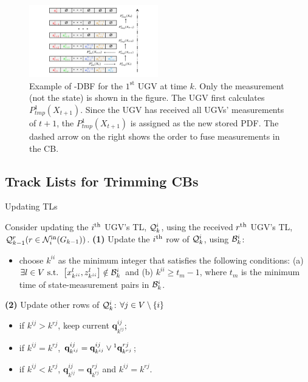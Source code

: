 	\begin{figure}%
		\centering
		\includegraphics[width=0.50\textwidth]{figures/fifo-dbf}
		\caption{Example of \proto-DBF for the $1^\text{st}$ UGV at time $k$. 
			Only the measurement (not the state) is shown in the figure.
			The UGV first calculates $ P^1_{tmp}(X_{t+1})$. 
			Since the UGV has received all UGVs' measurements of $t+1$, the $ P^1_{tmp}(X_{t+1})$ is assigned as the new stored PDF. 
			The dashed arrow on the right shows the order to fuse measurements in the CB.}
		\label{fig:LIFO-DBF}
	\end{figure}			
	
	\subsection{Track Lists for Trimming CBs}\label{subsec:tracklist}
	
	\begin{algorithm}
		\caption{Updating TLs}
		\label{alg:upd_tl}
		\begin{algorithmic}
			\State Consider updating the $i^\text{th}$ UGV's TL, $\mathcal{Q}^i_k$, using the received $r^\text{th}$ UGV's TL, $\mathcal{Q}^r_{k-1}(r\in \mathcal{N}^\text{in}_i(G_{k-1}))$.		
			\State \textbf{(1)} Update the $i^\text{th}$ row of $\mathcal{Q}^i_k$, using $\mathcal{B}^i_k$:
			\begin{itemize}
				\item choose $k^{ii}$ as the minimum integer that satisfies the following conditions: (a) $\exists l\in V \text{ s.t. } \left[x^l_{k^{ii}},z^l_{k^{ii}}\right]\notin \mathcal{B}^i_k$ and (b) $k^{ii} \ge t_m-1$, where $t_m$ is the minimum time of state-measurement pairs in $\mathcal{B}^i_k$.
			\end{itemize}
			\State \textbf{(2)} Update other rows of $\mathcal{Q}^i_k$:
			$\forall j\in V\setminus\left\lbrace i\right\rbrace$
			\begin{itemize} 
				\item if $k^{ij}>k^{rj}$, keep current $\mathbf{q}^{ij}_{k^{ij}}$;
				\item if $k^{ij}=k^{rj}$, $\mathbf{q}^{ij}_{k^{ij}}=\mathbf{q}^{ij}_{k^{ij}} \lor\footnotemark\mathbf{q}^{rj}_{k^{rj}}$; 
				\item if $k^{ij}<k^{rj}$, $\mathbf{q}^{ij}_{k^{ij}}=\mathbf{q}^{rj}_{k^{rj}}$ and $k^{ij}=k^{rj}$.
			\end{itemize}
		\end{algorithmic}
	\end{algorithm}
		
